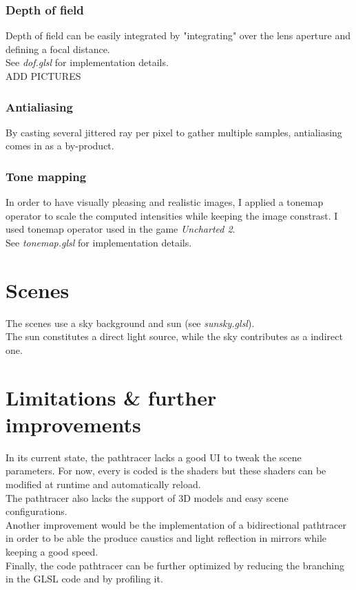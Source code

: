 \documentclass[a4paper,10pt]{article}
\begin{document}
\subsubsection{Depth of field}

Depth of field can be easily integrated by "integrating" over the lens aperture and defining a focal distance. \\
See \textit{dof.glsl} for implementation details.\\

ADD PICTURES


\subsubsection{Antialiasing}

By casting several jittered ray per pixel to gather multiple samples, antialiasing comes in as a by-product.

\subsubsection{Tone mapping}

In order to have visually pleasing and realistic images, I applied a tonemap operator to scale the computed intensities while keeping the image constrast. I used tonemap operator used in the game \textit{Uncharted 2}.\\
See \textit{tonemap.glsl} for implementation details.


\section{Scenes}

The scenes use a sky background and sun (see \textit{sunsky.glsl}). \\
The sun constitutes a direct light source, while the sky contributes as a indirect one.


\section{Limitations \& further improvements}

In its current state, the pathtracer lacks a good UI to tweak the scene parameters. For now, every is coded is the shaders but these shaders can be modified at runtime and automatically reload. \\
The pathtracer also lacks the support of 3D models and easy scene configurations.\\
Another improvement would be the implementation of a bidirectional pathtracer in order to be able the produce caustics and light reflection in mirrors while keeping a good speed. \\
Finally, the code pathtracer can be further optimized by reducing the branching in the GLSL code and by profiling it.
\end{document}
